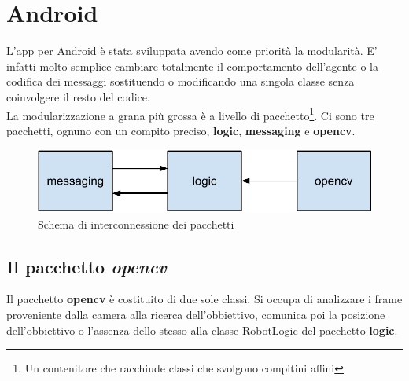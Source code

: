 \section {Android}
L'app per Android è stata sviluppata avendo come priorità la modularità. E' 
infatti molto semplice cambiare totalmente il comportamento dell'agente o la 
codifica dei messaggi sostituendo o modificando una singola classe senza 
coinvolgere il resto del codice.\\
La modularizzazione a grana più grossa è a livello di pacchetto\footnote{Un contenitore 
che racchiude classi che svolgono compitini affini}. Ci sono tre pacchetti,
ognuno con un compito preciso, \textbf{logic}, \textbf{messaging} e \textbf{opencv}.
\begin{figure}[H] \center
\includegraphics[width=\textwidth]{immagini/interconnessione_pacchetti.pdf}
\caption{Schema di interconnessione dei pacchetti} 
\end{figure}

\subsection {Il pacchetto \textit{opencv}}
Il pacchetto \textbf{opencv} è costituito di due sole classi. Si occupa di analizzare 
i frame proveniente dalla camera alla ricerca dell'obbiettivo, comunica poi la posizione 
dell'obbiettivo o l'assenza dello stesso alla classe RobotLogic del pacchetto 
\textbf{logic}.
